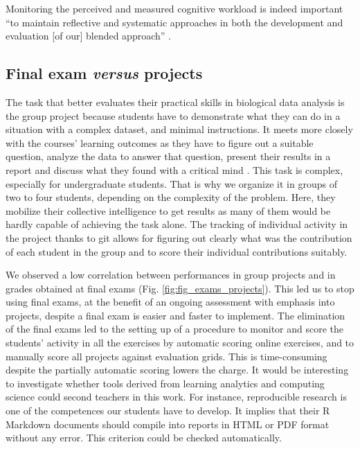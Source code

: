 \documentclass{aims}
\theoremstyle{definition}
\begin{document}
Monitoring the perceived and measured cognitive workload is indeed
important ``to maintain reflective and systematic approaches in both the
development and evaluation {[}of our{]} blended approach''
\cite{Spadafora2018}.

\hypertarget{final-exam-versus-projects-2}{%
\subsection{\texorpdfstring{Final exam \emph{versus}
projects}{Final exam versus projects}}\label{final-exam-versus-projects-2}}

The task that better evaluates their practical skills in biological data
analysis is the group project because students have to demonstrate what
they can do in a situation with a complex dataset, and minimal
instructions. It meets more closely with the courses' learning outcomes
as they have to figure out a suitable question, analyze the data to
answer that question, present their results in a report and discuss what
they found with a critical mind \cite{Auker2020}. This task is complex,
especially for undergraduate students. That is why we organize it in
groups of two to four students, depending on the complexity of the
problem. Here, they mobilize their collective intelligence to get
results as many of them would be hardly capable of achieving the task
alone. The tracking of individual activity in the project thanks to git
allows for figuring out clearly what was the contribution of each
student in the group and to score their individual contributions
suitably.

We observed a low correlation between performances in group projects and
in grades obtained at final exams (Fig. \ref {fig:fig_exams_projects}).
This led us to stop using final exams, at the benefit of an ongoing
assessment with emphasis into projects, despite a final exam is easier
and faster to implement. The elimination of the final exams led to the
setting up of a procedure to monitor and score the students' activity in
all the exercises by automatic scoring online exercises, and to manually
score all projects against evaluation grids. This is time-consuming
despite the partially automatic scoring lowers the charge. It would be
interesting to investigate whether tools derived from learning analytics
and computing science could second teachers in this work. For instance,
reproducible research is one of the competences our students have to
develop. It implies that their R Markdown documents should compile into
reports in HTML or PDF format without any error. This criterion could be
checked automatically.
\end{document}
